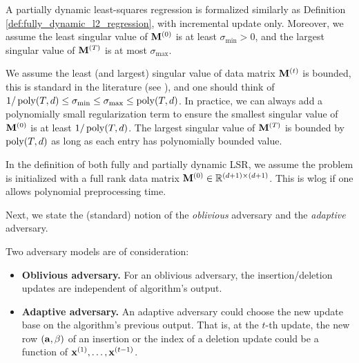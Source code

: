 \begin{definition}
A partially dynamic least-squares regression is formalized similarly as Definition \ref{def:fully_dynamic_l2_regression}, with incremental update only. Moreover, we assume the least singular value of $\mathbf{M}^{(0)}$ is at least $\sigma_{\min} > 0$, and the largest singular value of $\mathbf{M}^{(T)}$ is at most $\sigma_{\max}$. 
\end{definition}


\begin{remark}
We assume the least (and largest) singular value of data matrix $\mathbf{M}^{(t)}$ is bounded, this is standard in the literature (see \cite{cmp20, bhm+21}), and one should think of $1/\operatorname{poly}(T,d) \leq \sigma_{\min} \leq \sigma_{\max} \leq \operatorname{poly}(T, d)$. 
In practice, we can always add a polynomially small regularization term to ensure the smallest singular value of $\mathbf{M}^{(0)}$ is at least $1/\operatorname{poly}(T, d)$. The largest singular value of $\mathbf{M}^{(T)}$ is bounded by $\operatorname{poly}(T, d)$ as long as each entry has polynomially bounded value. 
\end{remark}


\begin{remark}[Preprocessing]
In the definition of both fully and partially dynamic LSR, we assume the problem is initialized with a full rank data matrix $\mathbf{M}^{(0)} \in \mathbb{R}^{(d+1)\times(d+1)}$. This is wlog if one allows polynomial preprocessing time.
\end{remark}







Next, we state the (standard) notion of the {\em oblivious} adversary and the {\em adaptive} adversary.
\begin{definition}
Two adversary models are of consideration:
\begin{itemize} 
\item {\bf Oblivious adversary.} For an oblivious adversary, the insertion/deletion updates are independent of algorithm's output. 
\item {\bf Adaptive adversary.} An adaptive adversary could choose the new update base on the algorithm's previous output. That is, at the $t$-th update, the new row $(\mathbf{a}, \beta)$ of an insertion or the index of a deletion update could be a function of $\mathbf{x}^{(1)}, \ldots, \mathbf{x}^{(t-1)}$.
\end{itemize}
\end{definition}







